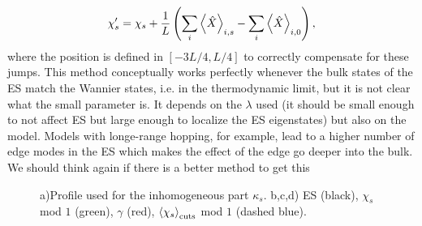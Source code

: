 \documentclass[twocolumn,amsmath,longbibliography,amssymb,superscriptaddress]{revtex4-1}
\newcommand{\carlos}[1]{{\color{red} #1}}
\begin{document}
\begin{equation}
\chi_s' = \chi_s + \frac{1}{L}\left(\sum_i\expval{\hat{X}}_{i,s}-\sum_i\expval{\hat{X}}_{i,0}\right),
\end{equation}
where the position is defined in $[-3L/4,L/4]$ to correctly compensate for these jumps. This method conceptually works perfectly whenever the bulk states of the ES match the Wannier states, i.e. in the thermodynamic limit, but it is not clear what the small parameter is. It depends on the $\lambda$ used (it should be small enough to not affect ES but large enough to localize the ES eigenstates) but also on the model. Models with longe-range hopping, for example, lead to a higher number of edge modes in the ES which makes the effect of the edge go deeper into the bulk. 
\carlos{We should think again if there is a better method to get this}

\begin{figure}[h!]
\centering
{}\hspace{0mm}


\caption{a)Profile used for the inhomogeneous part $\kappa_s$. b,c,d) ES (black), $\chi_s$ mod $1$ (green), $\gamma$ (red), $\expval{\chi_s}_{\rm cuts}$ mod $1$ (dashed blue).}
\label{wan}
\end{figure}
\end{document}
